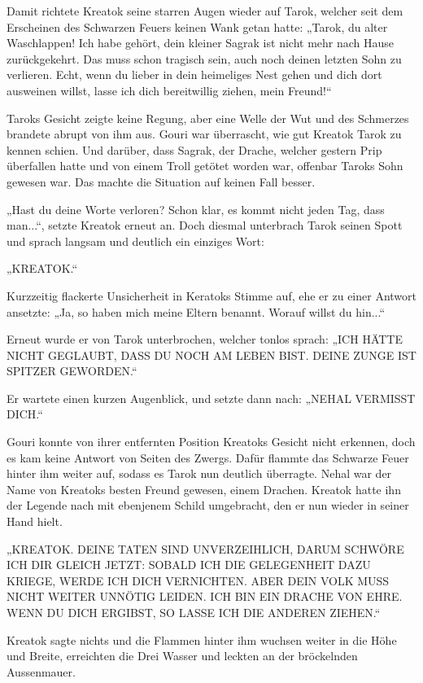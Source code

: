 Damit richtete Kreatok seine starren Augen wieder auf Tarok, welcher seit dem Erscheinen des Schwarzen Feuers keinen Wank getan hatte: „Tarok, du alter Waschlappen! Ich habe gehört, dein kleiner Sagrak ist nicht mehr nach Hause zurückgekehrt. Das muss schon tragisch sein, auch noch deinen letzten Sohn zu verlieren. Echt, wenn du lieber in dein heimeliges Nest gehen und dich dort ausweinen willst, lasse ich dich bereitwillig ziehen, mein Freund!“

Taroks Gesicht zeigte keine Regung, aber eine Welle der Wut und des Schmerzes brandete abrupt von ihm aus. Gouri war überrascht, wie gut Kreatok Tarok zu kennen schien. Und darüber, dass Sagrak, der Drache, welcher gestern Prip überfallen hatte und von einem Troll getötet worden war, offenbar Taroks Sohn gewesen war. Das machte die Situation auf keinen Fall besser.

„Hast du deine Worte verloren? Schon klar, es kommt nicht jeden Tag, dass man...“, setzte Kreatok erneut an. Doch diesmal unterbrach Tarok seinen Spott und sprach langsam und deutlich ein einziges Wort:

„KREATOK.“

Kurzzeitig flackerte Unsicherheit in Keratoks Stimme auf, ehe er zu einer Antwort ansetzte: „Ja, so haben mich meine Eltern benannt. Worauf willst du hin...“

Erneut wurde er von Tarok unterbrochen, welcher tonlos sprach: „ICH HÄTTE NICHT GEGLAUBT, DASS DU NOCH AM LEBEN BIST. DEINE ZUNGE IST SPITZER GEWORDEN.“

Er wartete einen kurzen Augenblick, und setzte dann nach: „NEHAL VERMISST DICH.“

Gouri konnte von ihrer entfernten Position Kreatoks Gesicht nicht erkennen, doch es kam keine Antwort von Seiten des Zwergs. Dafür flammte das Schwarze Feuer hinter ihm weiter auf, sodass es Tarok nun deutlich überragte. Nehal war der Name von Kreatoks besten Freund gewesen, einem Drachen. Kreatok hatte ihn der Legende nach mit ebenjenem Schild umgebracht, den er nun wieder in seiner Hand hielt.

„KREATOK. DEINE TATEN SIND UNVERZEIHLICH, DARUM SCHWÖRE ICH DIR GLEICH JETZT: SOBALD ICH DIE GELEGENHEIT DAZU KRIEGE, WERDE ICH DICH VERNICHTEN. ABER DEIN VOLK MUSS NICHT WEITER UNNÖTIG LEIDEN. ICH BIN EIN DRACHE VON EHRE. WENN DU DICH ERGIBST, SO LASSE ICH DIE ANDEREN ZIEHEN.“

Kreatok sagte nichts und die Flammen hinter ihm wuchsen weiter in die Höhe und Breite, erreichten die Drei Wasser und leckten an der bröckelnden Aussenmauer.

